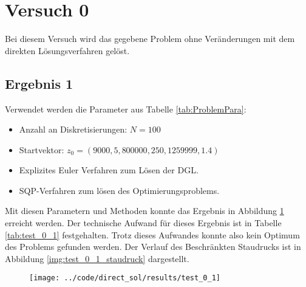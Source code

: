 













\section{Versuch 0}\label{kap:Versuch0}
Bei diesem Versuch wird das gegebene Problem ohne Veränderungen mit dem direkten Lösungsverfahren gelöst.

\subsection{Ergebnis 1}\label{kap:Versuch01}
Verwendet werden die Parameter aus Tabelle \ref{tab:ProblemPara}:
\begin{itemize}
\item Anzahl an Diskretisierungen: $N = 100$ 
\item Startvektor: $z_0 = (9000,5,800000,250,1259999,1.4)$
\item Explizites Euler Verfahren zum Lösen der DGL.
\item SQP-Verfahren zum lösen des Optimierungsproblems.
\end{itemize}
Mit diesen Parametern und Methoden konnte das Ergebnis in Abbildung \ref{img:test_0_1} erreicht werden. Der technische Aufwand für dieses Ergebnis ist in Tabelle \ref{tab:test_0_1} festgehalten. Trotz dieses Aufwandes konnte also kein Optimum des Problems gefunden werden. Der Verlauf des Beschränkten Staudrucks ist in Abbildung \ref{img:test_0_1_staudruck} dargestellt.
\begin{figure}[H]
\begin{center}
\texttt{[image: ../code/direct\_sol/results/test\_0\_1]}
 \label{img:test_0_1}
\end{center}
\end{figure}

